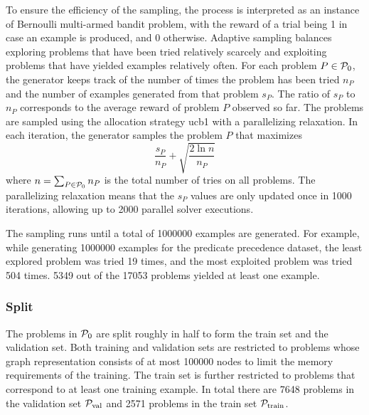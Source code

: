 To ensure the efficiency of the sampling, the process is interpreted as an instance of Bernoulli multi-armed bandit problem,
with the reward of a trial being 1 in case an example is produced, and 0 otherwise.
Adaptive sampling balances
exploring problems that have been tried relatively scarcely and
exploiting problems that have yielded examples relatively often.
For each problem $P \in \operatorname{\mathcal{P}_{0}}$,
the generator keeps track of the number of times the problem has been tried $n_P$
and the number of examples generated from that problem $s_P$.
The ratio of $s_P$ to $n_P$ corresponds to the average reward of problem $P$ observed so far.
The problems are sampled using the allocation strategy \acrshort{ucb1} \cite{Auer2002} with a parallelizing relaxation.
In each iteration, the generator samples the problem $P$ that maximizes
$$
\frac{s_P}{n_P} + \sqrt{\frac{2 \ln n}{n_P}}
$$
where $n = \sum_{P \in \operatorname{\mathcal{P}_{0}}} n_P$ is the total number of tries on all problems.
The parallelizing relaxation means that the $s_P$ values are only updated once in \num{1000} iterations,
allowing up to \num{2000} parallel solver executions.

The sampling runs until a total of \num{1000000} examples are generated.
For example, while generating \num{1000000} examples for the predicate precedence dataset,
the least explored problem was tried 19 times, and the most exploited problem was tried 504 times.
\num{5349} out of the \num{17053} problems yielded at least one example.

\subsubsection{Split}

The problems in $\operatorname{\mathcal{P}_{0}}$ are split roughly in half to form the train set and the validation set.
Both training and validation sets are restricted to problems whose graph representation consists of at most \num{100000} nodes
to limit the memory requirements of the training.
The train set is further restricted to problems that correspond to at least one training example.
In total there are \num{7648} problems in the validation set $\operatorname{\mathcal{P}_{\mathrm{val}}}$
and \num{2571} problems in the train set $\operatorname{\mathcal{P}_{\mathrm{train}}}$.

